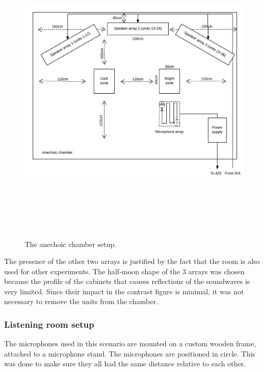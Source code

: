 \begin{figure}[H]
\centering
\includegraphics[width=14.5cm,height=15cm,keepaspectratio]{Figures/anechoicsetup}
\decoRule
\caption[Anechoic chamber setup]{The anechoic chamber setup.}
\label{fig:anechoicsetup}
\end{figure}

The presence of the other two arrays is justified by the fact that the room is also used for other experiments. The half-moon shape of the 3 arrays was chosen because the profile of the cabinets that causes reflections of the soundwaves is very limited. Since their impact in the contrast figure is minimal, it was not necessary to remove the units from the chamber.

\subsubsection{Listening room setup}

The microphones used in this scenario are mounted on a custom wooden frame, attached to a microphone stand. The microphones are positioned in circle. This was done to make sure they all had the same distance relative to each other.

